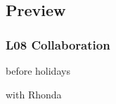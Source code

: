 \subsection{Preview}

\begin{frame}
	\frametitle{L08 Collaboration}

	before holidays

	with Rhonda
\end{frame}


%
%	
%	




